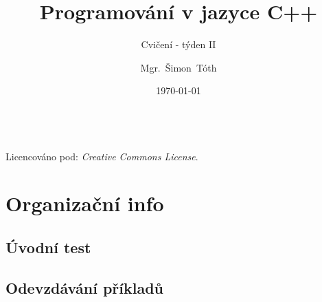 

\title{Programování v jazyce C++}
\subtitle{Cvičení - týden II}
\author[]{Mgr.~Šimon~Tóth}
\date{\today}

\newcommand{\CcNote}[1]{%
        Licencováno pod: \textit{Creative Commons #1 3.0 License}.%
}


        \begin{frame}
                \titlepage
                \vfill
                \begin{center}
                \\
                {\tiny\CcNote{\CcLongnameByNcSa}}
                \vspace*{2ex}
                \end{center}
        \end{frame}

\section{Organizační info}
%

\subsection{Úvodní test}


\subsection{Odevzdávání příkladů}

